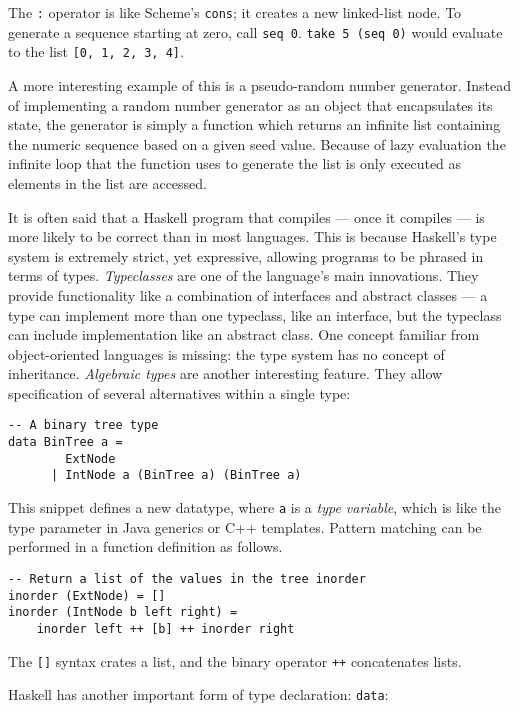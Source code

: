 \documentclass{article}
\begin{document}
\noindent The \verb!:! operator is like Scheme's \verb!cons!; it creates a new linked-list node.
To generate a sequence starting at zero, call \verb!seq 0!.
\verb!take 5 (seq 0)! would evaluate to the list \verb![0, 1, 2, 3, 4]!.

A more interesting example of this is a pseudo-random number generator.
Instead of implementing a random number generator as an object that encapsulates its state, the generator is simply a function which returns an infinite list containing the numeric sequence based on a given seed value.
Because of lazy evaluation the infinite loop that the function uses to generate the list is only executed as elements in the list are accessed.


It is often said that a Haskell program that compiles --- once it compiles --- is more likely to be correct than in most languages.
This is because Haskell's type system is extremely strict, yet expressive, allowing programs to be phrased in terms of types.
\textit{Typeclasses} are one of the language's main innovations\cite{hudak2007history}.
They provide functionality like a combination of interfaces and abstract classes --- a type can implement more than one typeclass, like an interface, but the typeclass can include implementation like an abstract class.
One concept familiar from object-oriented languages is missing: the type system has no concept of inheritance.
\textit{Algebraic types} are another interesting feature.
They allow specification of several alternatives within a single type:

\begin{verbatim}
-- A binary tree type
data BinTree a =
        ExtNode
      | IntNode a (BinTree a) (BinTree a)
\end{verbatim}

\noindent This snippet defines a new datatype, where \verb!a! is a \textit{type variable}, which is like the type parameter in Java generics or C++ templates.
Pattern matching can be performed in a function definition as follows.

\begin{verbatim}
-- Return a list of the values in the tree inorder
inorder (ExtNode) = []
inorder (IntNode b left right) =
    inorder left ++ [b] ++ inorder right
\end{verbatim}

\noindent The \verb![]! syntax crates a list, and the binary operator \verb!++! concatenates lists.

Haskell has another important form of type declaration: \verb!data!:
\end{document}
